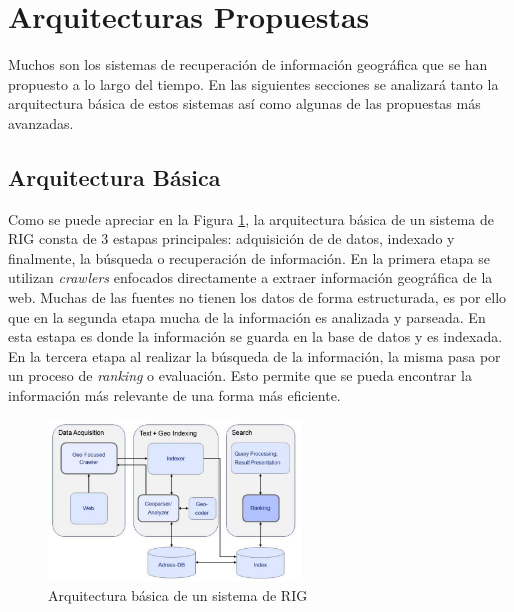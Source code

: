\documentclass{llncs}
\begin{document}
\newpage

\section{Arquitecturas Propuestas}\label{sec:arch}

Muchos son los sistemas de recuperación de información geográfica que se han
propuesto a lo largo del tiempo. En las siguientes secciones se analizará
tanto la arquitectura básica de estos sistemas así como algunas de las
propuestas más avanzadas.

\subsection{Arquitectura Básica}\label{sec:archbas}

Como se puede apreciar en la Figura \ref{fig:archbas}, la arquitectura básica
de un sistema de RIG consta de 3 estapas principales: adquisición de de datos,
indexado y finalmente, la búsqueda o recuperación de información. En la primera
etapa se utilizan \emph{crawlers} enfocados directamente a extraer información
geográfica de la web. Muchas de las fuentes no tienen los datos de forma
estructurada, es por ello que en la segunda etapa mucha de la información es
analizada y parseada. En esta estapa es donde la información se guarda en la
base de datos y es indexada. En la tercera etapa al realizar la búsqueda de la
información, la misma pasa por un proceso de \emph{ranking} o evaluación. Esto
permite que se pueda encontrar la información más relevante de una forma más
eficiente.

\begin{figure}[htb]%
	\begin{center}
		\includegraphics[width=0.6\textwidth]{basic_arch.jpg}
	\end{center}
	\caption{Arquitectura básica de un sistema de RIG \cite{cai2011}}
	\label{fig:archbas}
\end{figure}

\newpage
\end{document}
